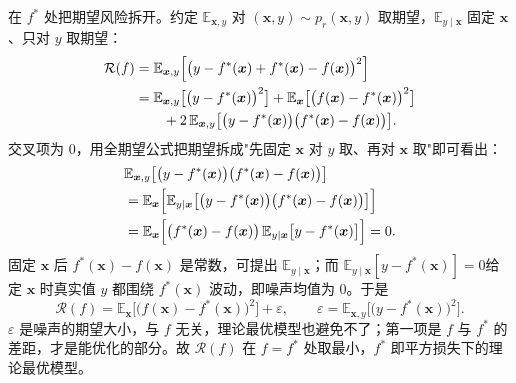 \documentclass[UTF8,a4paper,12pt]{ctexart}
\numberwithin{equation}{section}
\begin{document}
在 $f^{*}$ 处把期望风险拆开。约定 $\mathbb{E}_{\bm{x},y}$ 对 $(\bm{x},y)\sim p_r(\bm{x},y)$ 取期望，$\mathbb{E}_{y\mid\bm{x}}$ 固定 $\bm{x}$、只对 $y$ 取期望：
\begin{equation}\label{eq:3.3}
\begin{aligned}
\mathcal{R}(f)
&=\mathbb{E}_{\bm{x},y}\Bigl[\bigl(y-f^{*}(\bm{x})+f^{*}(\bm{x})-f(\bm{x})\bigr)^{2}\Bigr]\\
&=\mathbb{E}_{\bm{x},y}\bigl[\bigl(y-f^{*}(\bm{x})\bigr)^{2}\bigr]
+\mathbb{E}_{\bm{x}}\bigl[\bigl(f(\bm{x})-f^{*}(\bm{x})\bigr)^{2}\bigr]\\
&\qquad+2\,\mathbb{E}_{\bm{x},y}\bigl[\bigl(y-f^{*}(\bm{x})\bigr)\bigl(f^{*}(\bm{x})-f(\bm{x})\bigr)\bigr].
\end{aligned}
\end{equation}
交叉项为 $0$，用全期望公式把期望拆成"先固定 $\bm{x}$ 对 $y$ 取、再对 $\bm{x}$ 取"即可看出：
\begin{equation}\label{eq:3.4}
\begin{aligned}
&\mathbb{E}_{\bm{x},y}\bigl[\bigl(y-f^{*}(\bm{x})\bigr)\bigl(f^{*}(\bm{x})-f(\bm{x})\bigr)\bigr]\\
&=\mathbb{E}_{\bm{x}}\Bigl[\mathbb{E}_{y\mid\bm{x}}\bigl[\bigl(y-f^{*}(\bm{x})\bigr)\bigl(f^{*}(\bm{x})-f(\bm{x})\bigr)\bigr]\Bigr]\\
&=\mathbb{E}_{\bm{x}}\Bigl[\bigl(f^{*}(\bm{x})-f(\bm{x})\bigr)\,\mathbb{E}_{y\mid\bm{x}}\bigl[y-f^{*}(\bm{x})\bigr]\Bigr]=0.
\end{aligned}
\end{equation}
固定 $\bm{x}$ 后 $f^{*}(\bm{x})-f(\bm{x})$ 是常数，可提出 $\mathbb{E}_{y\mid\bm{x}}$；而 $\mathbb{E}_{y\mid\bm{x}}[y-f^{*}(\bm{x})]=0$给定 $\bm{x}$ 时真实值 $y$ 都围绕 $f^{*}(\bm{x})$ 波动，即噪声均值为 $0$。于是
\begin{equation}\label{eq:3.5}
\mathcal{R}(f)
=\mathbb{E}_{\bm{x}}\bigl[\bigl(f(\bm{x})-f^{*}(\bm{x})\bigr)^{2}\bigr]+\varepsilon,
\qquad
\varepsilon=\mathbb{E}_{\bm{x},y}\bigl[\bigl(y-f^{*}(\bm{x})\bigr)^{2}\bigr].
\end{equation}
$\varepsilon$ 是噪声的期望大小，与 $f$ 无关，理论最优模型也避免不了；第一项是 $f$ 与 $f^{*}$ 的差距，才是能优化的部分。故 $\mathcal{R}(f)$ 在 $f=f^{*}$ 处取最小，$f^{*}$ 即平方损失下的理论最优模型。
\end{document}
